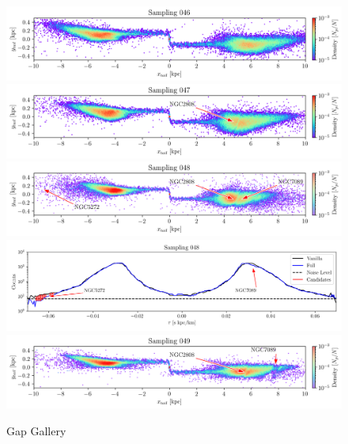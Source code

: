 \documentclass{aa}
\begin{document}
\begin{appendix}
    \begin{figure}
      \centering
      \includegraphics[width=\linewidth]{gallery_of_gaps_monte-carlo-046.png}
      \includegraphics[width=\linewidth]{gallery_of_gaps_monte-carlo-047.png}
      \includegraphics[width=\linewidth]{gallery_of_gaps_monte-carlo-048.png}
      \includegraphics[width=\linewidth]{tau-profile-monte-carlo-048.png}
      \includegraphics[width=\linewidth]{gallery_of_gaps_monte-carlo-049.png}
      \caption{Gap Gallery}
      \label{fig:gallery11}
    \end{figure} 

\end{appendix}
\end{document}
